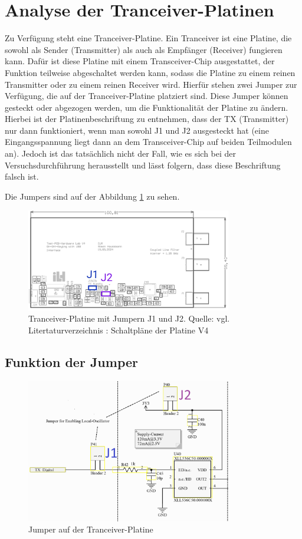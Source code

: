 \section{Analyse der Tranceiver-Platinen}
Zu Verfügung steht eine Tranceiver-Platine. Ein Tranceiver ist eine Platine, die sowohl als Sender (Transmitter) als auch als Empfänger (Receiver) fungieren kann. Dafür ist diese Platine mit einem Transceiver-Chip ausgestattet, der Funktion teilweise abgeschaltet werden kann, sodass die Platine zu einem reinen Transmitter oder zu einem reinen Receiver wird.  
Hierfür stehen zwei Jumper zur Verfügung, die auf der Tranceiver-Platine platziert sind. Diese Jumper können gesteckt oder abgezogen werden, um die Funktionalität der Platine zu ändern. Hierbei ist der Platinenbeschriftung zu entnehmen, dass der TX (Transmitter) nur dann funktioniert, wenn man sowohl J1 und J2 ausgesteckt hat (eine Eingangsspannung liegt dann an dem Transceiver-Chip auf beiden Teilmodulen an). Jedoch ist das tatsächlich nicht der Fall,
wie es sich bei der Versuchsdurchführung herausstellt und lässt folgern, dass diese Beschriftung falsch ist.

Die Jumpers sind auf der Abbildung \ref{fig:Tranceiver-Platine} zu sehen.
\begin{figure}[H]
    \centering
    \includegraphics[width=0.8\textwidth]{Pictures/Jumper.jpg}
    \caption{Tranceiver-Platine mit Jumpern J1 und J2. Quelle: vgl. Litertaturverzeichnis \cite{SchaltplanPCBV4}: Schaltpläne der Platine V4}
    \label{fig:Tranceiver-Platine}
\end{figure}
\subsection{Funktion der Jumper}
\begin{figure}[H]
    \centering
    \includegraphics[width=0.8\textwidth]{Pictures/JumperSchaltung.png}
    \caption{Jumper auf der Tranceiver-Platine}
    \label{fig:Jumper}
\end{figure}
